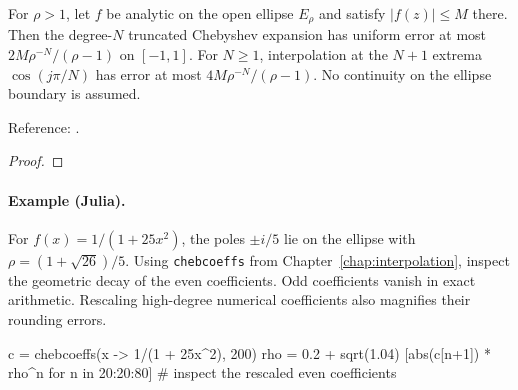 \begin{theorem}
\label{thm:geometric-error}
\leanok
For $\rho>1$, let $f$ be analytic on the open ellipse $E_\rho$ and satisfy $|f(z)|\le M$ there. Then the degree-$N$ truncated Chebyshev expansion
has uniform error at most $2M\rho^{-N}/(\rho-1)$ on $[-1,1]$.
For $N\ge1$, interpolation at the $N+1$ extrema $\cos(j\pi/N)$ has
error at most $4M\rho^{-N}/(\rho-1)$. No continuity on the ellipse boundary
is assumed.

Reference: \cite[Theorem 8.2]{atap}.
\end{theorem}
\begin{proof}
\leanok
\end{proof}

\paragraph{Example (Julia).} For $f(x)=1/(1+25x^2)$, the poles $\pm i/5$ lie on the ellipse with $\rho=(1+\sqrt{26})/5$. Using \texttt{chebcoeffs} from Chapter~\ref{chap:interpolation}, inspect the geometric decay of the even coefficients. Odd coefficients vanish in exact arithmetic. Rescaling high-degree numerical coefficients also magnifies their rounding errors.

\begin{juliacode}
c = chebcoeffs(x -> 1/(1 + 25x^2), 200)
rho = 0.2 + sqrt(1.04)
[abs(c[n+1]) * rho^n for n in 20:20:80]   # inspect the rescaled even coefficients
\end{juliacode}

